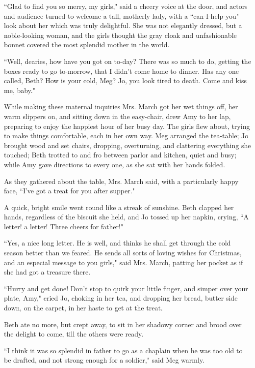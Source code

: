 ``Glad to find you so merry, my girls," said a cheery voice at the door,
and actors and audience turned to welcome a tall, motherly lady, with a
``can-I-help-you" look about her which was truly delightful. She was not
elegantly dressed, but a noble-looking woman, and the girls thought the
gray cloak and unfashionable bonnet covered the most splendid mother in
the world.

``Well, dearies, how have you got on to-day? There was so much to do,
getting the boxes ready to go to-morrow, that I didn't
come home to dinner. Has any one called, Beth? How is your cold, Meg?
Jo, you look tired to death. Come and kiss me, baby."

While making these maternal inquiries Mrs. March got her wet things off,
her warm slippers on, and sitting down in the easy-chair, drew Amy to
her lap, preparing to enjoy the happiest hour of her busy day. The girls
flew about, trying to make things comfortable, each in her own way. Meg
arranged the tea-table; Jo brought wood and set chairs, dropping,
overturning, and clattering everything she touched; Beth trotted to and
fro between parlor and kitchen, quiet and busy; while Amy gave
directions to every one, as she sat with her hands folded.

As they gathered about the table, Mrs. March said, with a particularly
happy face, ``I've got a treat for you after supper."

A quick, bright smile went round like a streak of sunshine. Beth clapped
her hands, regardless of the biscuit she held, and Jo tossed up her
napkin, crying, ``A letter! a letter! Three cheers for father!"

``Yes, a nice long letter. He is well, and thinks he shall get through
the cold season better than we feared. He sends all sorts of loving
wishes for Christmas, and an especial message to you girls," said Mrs.
March, patting her pocket as if she had got a treasure there.

``Hurry and get done! Don't stop to quirk your little
finger, and simper over your plate, Amy," cried Jo, choking in her tea,
and dropping her bread, butter side down, on the carpet, in her haste to
get at the treat.

Beth ate no more, but crept away, to sit in her shadowy corner and brood
over the delight to come, till the others were ready.

``I think it was so splendid in father to go as a chaplain when he was
too old to be drafted, and not strong enough for a soldier," said Meg
warmly.


